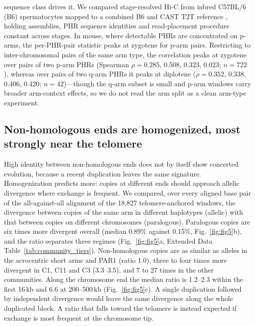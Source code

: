 \documentclass[pdflatex,mathphys]{jnl}
\begin{document}
sequence class drives it. We compared stage-resolved Hi-C from inbred C57BL/6 (B6) spermatocytes mapped to a combined B6 and CAST T2T reference \cite{Francis2025,Zuo2021}, holding assemblies, PHR sequence identities and read-placement
procedure constant across stages.
In mouse, where detectable PHRs are concentrated on p-arms, the per-PHR-pair
statistic peaks at zygotene for p-arm pairs. Restricting to inter-chromosomal pairs of the same
arm type, the correlation peaks at zygotene over pairs of two p-arm PHRs
(Spearman $\rho = 0.285$, 0.508, 0.323, 0.023; $n = 722$), whereas over pairs
of two q-arm PHRs it peaks at diplotene ($\rho = 0.352$, 0.338, 0.406, 0.420;
$n = 42$)---though the q-arm subset is small and p-arm windows carry broader
arm-context effects, so we do not read the arm split as a clean arm-type
experiment.

\subsection*{Non-homologous ends are homogenized, most strongly near the telomere}

High identity between non-homologous ends does not by itself show concerted evolution, because a
recent duplication leaves the same signature. Homogenization predicts more: copies at different ends
should approach allelic divergence where exchange is frequent. We compared, over every aligned base
pair of the all-against-all alignment of the 18,827 telomere-anchored windows, the divergence between
copies of the same arm in different haplotypes (allelic) with that between copies on different
chromosomes (paralogous). Paralogous copies are six times more divergent overall (median 0.89\%
against 0.15\%, Fig.~\ref{fig:fig5}b), and the ratio separates three regimes
(Fig.~\ref{fig:fig5}a, Extended Data Table~\ref{tab:community_tiers}). Non-homologous copies are as
similar as alleles in the acrocentric short arms and PAR1 (ratio 1.0), three to four times more
divergent in C1, C11 and C3 (3.3--3.5), and 7 to 27 times in the other communities. Along the
chromosome end the median ratio is 1.2--2.3 within the first 16\,kb and 6.6 at 200--500\,kb
(Fig.~\ref{fig:fig5}c). A single duplication followed by independent divergence would leave the same
divergence along the whole duplicated block. A ratio that falls toward the telomere is instead
expected if exchange is most frequent at the chromosome tip.
\end{document}
